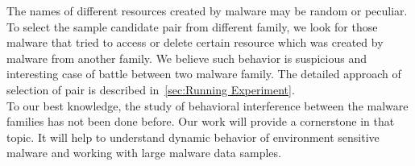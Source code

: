 The names of different resources created by malware may  be random or peculiar.
To select the sample candidate pair from different family, we look for those malware that tried to access or delete certain resource which was created by malware from another family.
We believe such behavior is suspicious and interesting case of battle between two malware family.
The detailed approach of selection of pair is described in~\autoref{sec:Running Experiment}.\\
To our best knowledge, the study of behavioral interference between the malware families has not been done before.
Our work will provide a cornerstone in that topic.
It will help to understand dynamic behavior of environment sensitive malware and working with large malware data samples.
